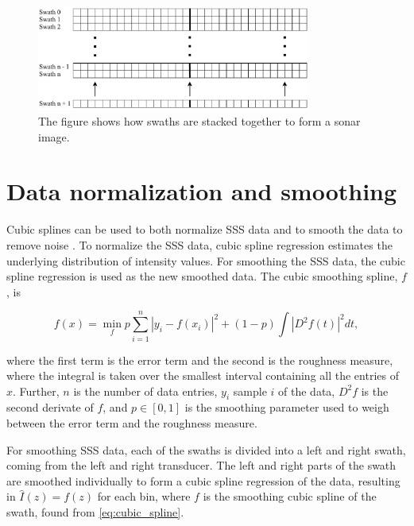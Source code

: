 \begin{figure}[ht]
    \centering
    \includegraphics[width=0.8\textwidth]{figures/stacking_of_sonar_image.drawio.pdf}
    \caption{The figure shows how swaths are stacked together to form a sonar image.}
    \label{fig:stacking_of_sonar_image}
\end{figure}

\section{Data normalization and smoothing}

Cubic splines can be used to both normalize SSS data \cite{ReitanHogstad2022Side-ScanAutonomy} and to smooth the data to remove noise \cite{Al-Rawi2017LandmarkImages}. To normalize the SSS data, cubic spline regression estimates the underlying distribution of intensity values. For smoothing the SSS data, the cubic spline regression is used as the new smoothed data. The cubic smoothing spline, $f$, is 

\begin{equation}
    {f}(x) = \min_{f} p \sum_{i=1}^n |y_i-f(x_i)|^2 + (1-p) \int|D^2f(t)|^2dt,
    \label{eq:cubic_spline}
\end{equation}

where the first term is the error term and the second is the roughness measure,  where the integral is taken over the smallest interval containing all the entries of $x$. Further, $n$ is the number of data entries, $y_i$ sample $i$ of the data, $D^2f$ is the second derivate of $f$, and $p \in [0,1]$ is the smoothing parameter used to weigh between the error term and the roughness measure. 

For smoothing SSS data, each of the swaths is divided into a left and right swath, coming from the left and right transducer. The left and right parts of the swath are smoothed individually to form a cubic spline regression of the data, resulting in $\hat{I}(z) = f(z)$ for each bin, where $f$ is the smoothing cubic spline of the swath, found from \cref{eq:cubic_spline}.

